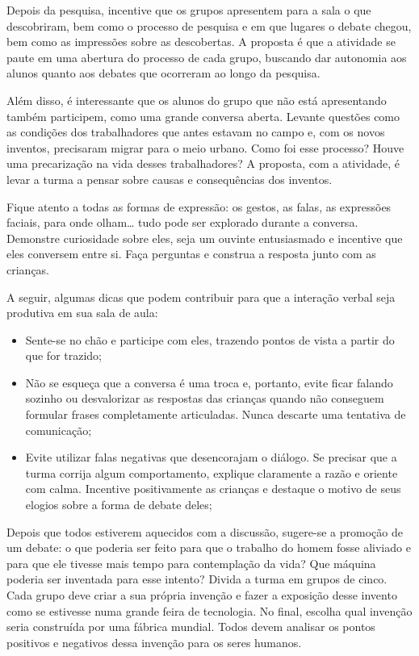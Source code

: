 \documentclass[11pt]{extarticle}
\begin{document}
Depois da pesquisa, incentive que os grupos apresentem para a sala o que descobriram, bem como o processo de pesquisa e em que lugares o debate chegou, bem como as impressões sobre as descobertas. A proposta é que a atividade se paute em uma abertura do processo de cada grupo, buscando dar autonomia aos alunos quanto aos debates que ocorreram ao longo da pesquisa. 

Além disso, é interessante que os alunos do grupo que não está apresentando também participem, como uma grande conversa aberta. Levante questões como as condições dos trabalhadores que antes estavam no campo e, com os novos inventos, precisaram migrar para o meio urbano. Como foi esse processo? Houve uma precarização na vida desses trabalhadores? A proposta, com a atividade, é levar a turma a pensar sobre causas e consequências dos inventos. 

Fique atento a todas as formas de expressão: os gestos, as falas, as 
expressões faciais, para onde olham\ldots{} tudo pode ser explorado durante a conversa. 
Demonstre curiosidade sobre eles, seja um ouvinte entusiasmado e incentive que eles 
conversem entre si. Faça perguntas e construa a resposta junto com as crianças. 

A seguir, algumas dicas que podem contribuir para que a interação verbal seja produtiva em sua sala de aula: 

\begin{itemize}
\item Sente-se no chão e participe com eles, trazendo pontos de vista a partir do que for trazido;

\item Não se esqueça que a conversa é uma troca e, portanto, evite ficar falando sozinho ou desvalorizar as respostas das 
crianças quando não conseguem formular frases completamente articuladas. Nunca descarte uma tentativa de comunicação; 

\item Evite utilizar falas negativas que desencorajam o diálogo. Se precisar que a turma corrija algum comportamento, explique claramente a razão e oriente com calma. Incentive positivamente as crianças e destaque o motivo de seus elogios sobre a forma de debate deles; 

\end{itemize}

Depois que todos estiverem aquecidos com a discussão, sugere-se a promoção de um debate: o que poderia ser feito para que o trabalho do homem fosse aliviado e para que ele tivesse mais tempo para contemplação da vida? Que máquina poderia ser inventada para esse intento? Divida a turma em grupos de cinco. Cada grupo deve criar a sua própria invenção e fazer a exposição desse invento como se estivesse numa grande feira de tecnologia. No final, escolha qual invenção seria construída por uma fábrica mundial. Todos devem analisar os pontos positivos e negativos dessa invenção para os seres humanos.
\end{document}
